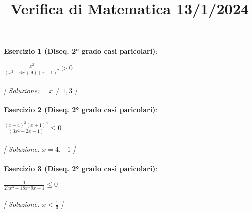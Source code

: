 \documentclass{article}
\title{\raggedright Verifica di Matematica  13/1/2024}
\date{}
\begin{document}
\maketitle

\textbf{Esercizio 1 (Diseq. \ang{2} grado casi paricolari)}:\\
\par $\frac{x^2}{(x^2-6x+9)(x-1)^2} > 0$ \\\\

\textit{[ Soluzione: $\quad x \neq 1,3$ ]}\\\\

\textbf{Esercizio 2 (Diseq. \ang{2} grado casi paricolari)}:\\
\par $\frac{(x-4)^2(x+1)^4}{(3x^2+2x+1)} \leq 0$ \\\\

\textit{[ Soluzione: $x = 4,-1$ ]}\\\\

\textbf{Esercizio 3 (Diseq. \ang{2} grado casi paricolari)}:\\
\par $\frac{1}{27x^3-18x^+9x-1} \leq 0$ \\\\

\textit{[ Soluzione: $x<\frac{1}{3}$ ]}\\\\
\end{document}

